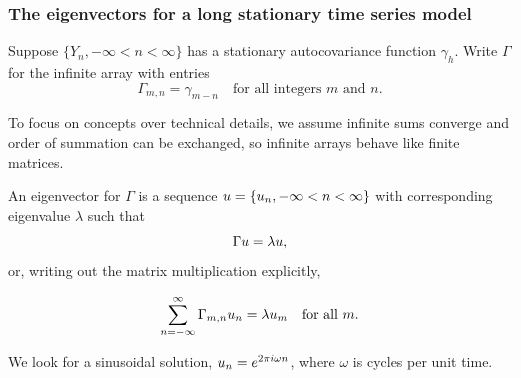 \begin{frame}[fragile]
\frametitle{The eigenvectors for a long stationary time series model}


\bi
\item  Suppose $\{Y_n,-\infty<n<\infty\}$ has a stationary autocovariance function $\gamma_h$. Write $\Gamma$ for the infinite array with entries
\begin{equation} \Gamma_{m,n} = \gamma_{m-n} \quad \mbox{for all integers $m$ and $n$}.\end{equation}
\item To focus on concepts over technical details, we assume infinite sums converge and order of summation can be exchanged, so infinite arrays behave like finite matrices.
\item  An eigenvector for $\Gamma$ is a sequence $u=\{u_n, -\infty<n<\infty\}$ with corresponding eigenvalue $\lambda$ such that
\begin{equation}\Gamma u = \lambda u,\end{equation}
or, writing out the matrix multiplication explicitly,


\begin{equation}\sum_{n=-\infty}^\infty \Gamma_{m,n} u_n = \lambda u_m\quad \mbox{for all $m$}.\end{equation}


\item  We look for a sinusoidal solution, $u_n = e^{2\pi i\omega n}$, where $\omega$ is cycles per unit time.

\ei

\end{frame}

